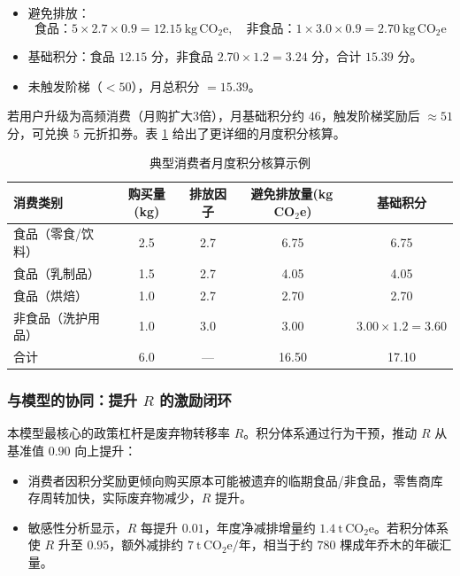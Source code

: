 \documentclass{article}
\begin{document}
\begin{itemize}
    \item 避免排放：
    \[
    \text{食品}：5\times2.7\times0.9=12.15\ \mathrm{kg\,CO_2e},\quad
    \text{非食品}：1\times3.0\times0.9=2.70\ \mathrm{kg\,CO_2e}
    \]
    \item 基础积分：食品 $12.15$ 分，非食品 $2.70\times1.2=3.24$ 分，合计 $15.39$ 分。
    \item 未触发阶梯（$<50$），月总积分 $=15.39$。
\end{itemize}

若用户升级为高频消费（月购扩大3倍），月基础积分约 $46$，触发阶梯奖励后 $\approx51$ 分，可兑换 $5$ 元折扣券。表 \ref{tab:consumer_credit_example} 给出了更详细的月度积分核算。

\begin{table}[htbp]
\centering
\caption{典型消费者月度积分核算示例}
\label{tab:consumer_credit_example}
\begin{tabular}{|l|c|c|c|c|}
\hline
消费类别 & 购买量(kg) & 排放因子 & 避免排放量(kg\,CO$_2$e) & 基础积分 \\
\hline
食品（零食/饮料） & 2.5 & 2.7 & 6.75 & 6.75 \\
\hline
食品（乳制品）   & 1.5 & 2.7 & 4.05 & 4.05 \\
\hline
食品（烘焙）     & 1.0 & 2.7 & 2.70 & 2.70 \\
\hline
非食品（洗护用品）& 1.0 & 3.0 & 3.00 & $3.00\times1.2=3.60$ \\
\hline
合计             & 6.0  & ---  & 16.50 & 17.10 \\
\hline
\end{tabular}
\end{table}

\subsubsection{与模型的协同：提升 $R$ 的激励闭环}

本模型最核心的政策杠杆是废弃物转移率 $R$。积分体系通过行为干预，推动 $R$ 从基准值 $0.90$ 向上提升：

\begin{itemize}
    \item 消费者因积分奖励更倾向购买原本可能被遗弃的临期食品/非食品，零售商库存周转加快，实际废弃物减少，$R$ 提升。
    \item 敏感性分析显示，$R$ 每提升 $0.01$，年度净减排增量约 $1.4\ \mathrm{t\,CO_2e}$。若积分体系使 $R$ 升至 $0.95$，额外减排约 $7\ \mathrm{t\,CO_2e/年}$，相当于约 $780$ 棵成年乔木的年碳汇量。
\end{itemize}
\end{document}
